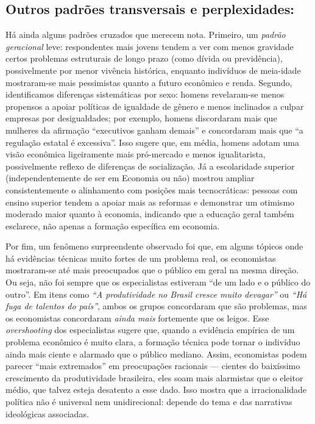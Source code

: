 \subsection{Outros padrões transversais e perplexidades:} 

Há ainda alguns padrões cruzados que merecem nota. Primeiro, um \emph{padrão geracional} leve: respondentes mais jovens tendem a ver com menos gravidade certos problemas estruturais de longo prazo (como dívida ou previdência), possivelmente por menor vivência histórica, enquanto indivíduos de meia-idade mostraram-se mais pessimistas quanto a futuro econômico e renda. Segundo, identificamos diferenças sistemáticas por sexo: homens revelaram-se menos propensos a apoiar políticas de igualdade de gênero e menos inclinados a culpar empresas por desigualdades; por exemplo, homens discordaram mais que mulheres da afirmação “executivos ganham demais” e concordaram mais que “a regulação estatal é excessiva”. Isso sugere que, em média, homens adotam uma visão econômica ligeiramente mais pró-mercado e menos igualitarista, possivelmente reflexo de diferenças de socialização. Já a escolaridade superior (independentemente de ser em Economia ou não) mostrou ampliar consistentemente o alinhamento com posições mais tecnocráticas: pessoas com ensino superior tendem a apoiar mais as reformas e demonstrar um otimismo moderado maior quanto à economia, indicando que a educação geral também esclarece, não apenas a formação específica em economia. 

Por fim, um fenômeno surpreendente observado foi que, em alguns tópicos onde há evidências técnicas muito fortes de um problema real, os economistas mostraram-se até mais preocupados que o público em geral na mesma direção. Ou seja, não foi sempre que os especialistas estiveram “de um lado e o público do outro”. Em itens como \emph{“A produtividade no Brasil cresce muito devagar”} ou \emph{“Há fuga de talentos do país”}, ambos os grupos concordaram que são problemas, mas os economistas concordaram \emph{ainda mais} fortemente que os leigos. Esse \emph{overshooting} dos especialistas sugere que, quando a evidência empírica de um problema econômico é muito clara, a formação técnica pode tornar o indivíduo ainda mais ciente e alarmado que o público mediano. Assim, economistas podem parecer “mais extremados” em preocupações racionais — cientes do baixíssimo crescimento da produtividade brasileira, eles soam mais alarmistas que o eleitor médio, que talvez esteja desatento a esse dado. Isso mostra que a irracionalidade política não é universal nem unidirecional: depende do tema e das narrativas ideológicas associadas.

